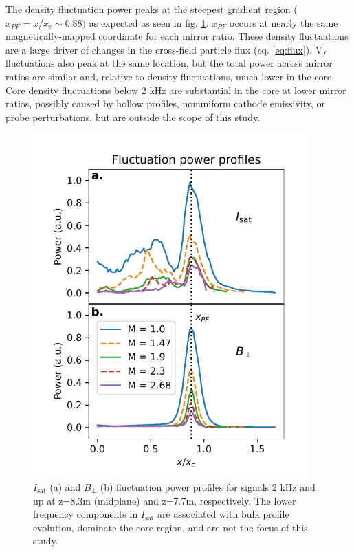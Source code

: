 The density fluctuation power peaks at the steepest gradient region ($x_{PF} = x/x_c \sim 0.88)$ as expected as seen in fig. \ref{fig:isat-fluct-prof}. $x_{PF}$ occurs at nearly the same magnetically-mapped coordinate for each mirror ratio. These density fluctuations are a large driver of changes in the cross-field particle flux (eq. \ref{eq:flux}). V$_f$ fluctuations also peak at the same location, but the total power across mirror ratios are similar and, relative to density fluctuations, much lower in the core. Core density fluctuations below 2 kHz are substantial in the core at lower mirror ratios, possibly caused by hollow profiles, nonuniform cathode emissivity, or probe perturbations, but are outside the scope of this study. 
\begin{figure}
    \centering
    \includegraphics[width=300pt]{figures/fig7.pdf}
    \caption[$I_\text{sat}$ and $B_\perp$ fluctuation power profiles]{$I_\text{sat}$ (a) and $B_\perp$ (b) fluctuation power profiles for signals 2 kHz and up at z=8.3m (midplane) and z=7.7m, respectively. The lower frequency components in $I_\text{sat}$ are associated with bulk profile evolution, dominate the core region, and are not the focus of this study.}
    \label{fig:isat-fluct-prof}
\end{figure}


